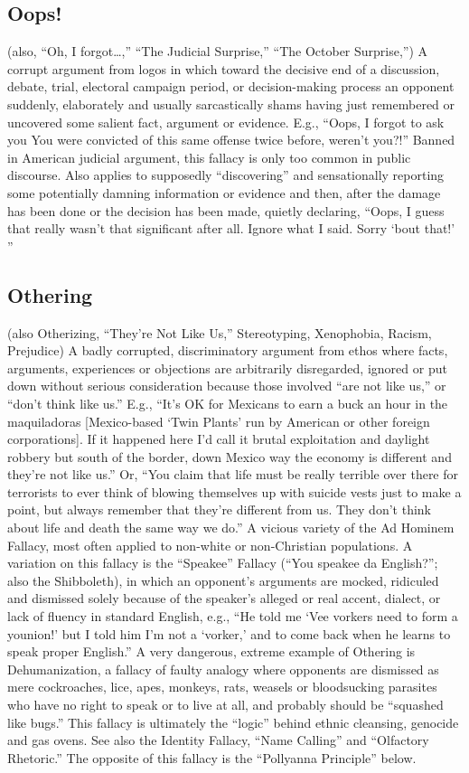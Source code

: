 \documentclass[10pt,a4paper,british]{article}
\begin{document}
\begin{multicols}{2}
    \subsection{Oops!} (also, ``Oh, I forgot\ldots,'' ``The Judicial Surprise,'' ``The October Surprise,'') A corrupt argument from logos in which toward the decisive end of a discussion, debate, trial, electoral campaign period, or decision{-}making process an opponent suddenly, elaborately and usually sarcastically shams having just remembered or uncovered some salient fact, argument or evidence.  E.g., ``Oops, I forgot to ask you  You were convicted of this same offense twice before, weren't you?!'' Banned in American judicial argument, this fallacy is only too common in public discourse. Also applies to supposedly ``discovering'' and sensationally reporting some potentially damning information or evidence and then, after the damage has been done or the decision has been made, quietly declaring, ``Oops, I guess that really wasn't that significant after all. Ignore what I said. Sorry `bout that!' '' 

    \subsection{Othering} (also Otherizing, ``They're Not Like Us,'' Stereotyping, Xenophobia, Racism, Prejudice) A badly corrupted, discriminatory argument from ethos where facts, arguments, experiences or objections are arbitrarily disregarded, ignored or put down without serious consideration because those involved ``are not like us,'' or ``don't think like us.'' E.g., ``It's OK for Mexicans to earn a buck an hour in the maquiladoras [Mexico{-}based `Twin Plants' run by American or other foreign corporations]. If it happened here I'd call it brutal exploitation and daylight robbery but south of the border, down Mexico way the economy is different and they're not like us.''  Or, ``You claim that life must be really terrible over there for terrorists to ever think of blowing themselves up with suicide vests just to make a point, but always remember that they're different from us. They don't think about life and death the same way we do.'' A vicious variety of the Ad Hominem Fallacy, most often applied to non{-}white or non{-}Christian populations. A variation on this fallacy is the ``Speakee'' Fallacy (``You speakee da English?''; also the Shibboleth), in which an opponent's arguments are mocked, ridiculed and dismissed solely because of the speaker's alleged or real accent, dialect, or lack of fluency in standard English, e.g., ``He told me `Vee vorkers need to form a younion!' but I told him I'm not a `vorker,' and to come back when he learns to speak proper English.'' A very dangerous, extreme example of Othering is Dehumanization, a fallacy of faulty analogy where opponents are dismissed as mere cockroaches, lice, apes, monkeys, rats, weasels or bloodsucking parasites who have no right to speak or to live at all, and probably should be ``squashed like bugs.'' This fallacy is ultimately the ``logic'' behind ethnic cleansing, genocide and gas ovens.  See also the Identity Fallacy, ``Name Calling'' and ``Olfactory Rhetoric.'' The opposite of this fallacy is the ``Pollyanna Principle'' below.  


\end{multicols}
\end{document}
